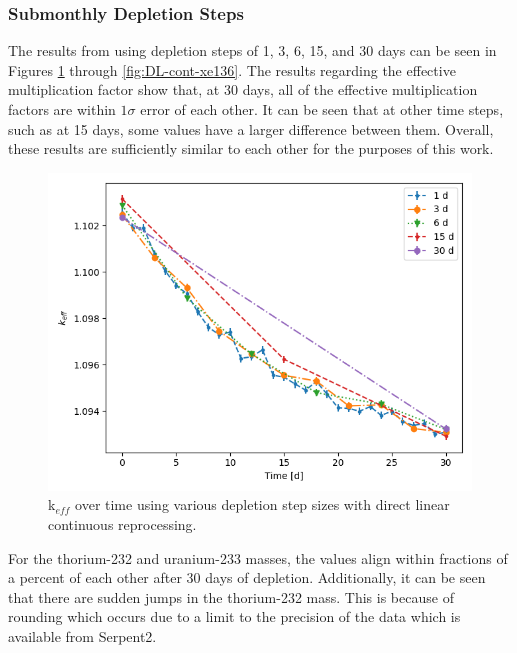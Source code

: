 \subsubsection{Submonthly Depletion Steps}

The results from using depletion steps of 1, 3, 6, 15, and 30 days can be seen in Figures \ref{fig:DL-cont-k} through \ref{fig:DL-cont-xe136}. The results regarding the effective multiplication factor show that, at 30 days, all of the effective multiplication factors are within $1\sigma$ error of each other. It can be seen that at other time steps, such as at 15 days, some values have a larger difference between them. Overall, these results are sufficiently similar to each other for the purposes of this work.

\begin{figure}[H]
  \centering
  \includegraphics[scale=0.7]{images/DL_NSTEP_keff.png}
  \caption{k$_{eff}$ over time using various depletion step sizes with direct linear continuous reprocessing.}
   \label{fig:DL-cont-k}
\end{figure}

For the thorium-232 and uranium-233 masses, the values align within fractions of a percent of each other after 30 days of depletion. Additionally, it can be seen that there are sudden jumps in the thorium-232 mass. This is because of rounding which occurs due to a limit to the precision of the data which is available from Serpent2.

